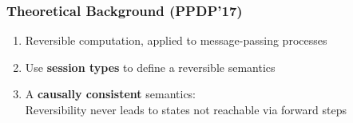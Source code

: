 \documentclass[12pt]{beamer}
\begin{document}
\begin{frame}
\frametitle{Theoretical Background (PPDP'17)}

\begin{enumerate}[-]
\item Reversible computation, applied to message-passing processes
\item Use \textbf{session types} to define a reversible semantics
\item A \textbf{causally consistent} semantics: \\ Reversibility never leads to states not reachable via forward steps
\end{enumerate}




\end{frame}
    
\end{document}
